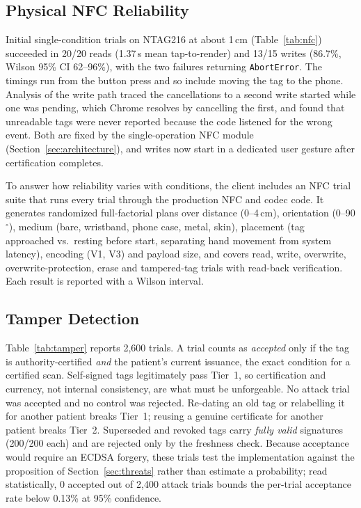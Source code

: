 \documentclass[conference]{IEEEtran}
\begin{document}


\subsection{Physical NFC Reliability}
\label{sec:nfc-results}
Initial single-condition trials on NTAG216 at about 1\,cm (Table~\ref{tab:nfc}) succeeded in 20/20 reads (1.37\,s mean tap-to-render) and 13/15 writes (86.7\%, Wilson 95\% CI 62--96\%), with the two failures returning \texttt{AbortError}. The timings run from the button press and so include moving the tag to the phone. Analysis of the write path traced the cancellations to a second write started while one was pending, which Chrome resolves by cancelling the first, and found that unreadable tags were never reported because the code listened for the wrong event. Both are fixed by the single-operation NFC module (Section~\ref{sec:architecture}), and writes now start in a dedicated user gesture after certification completes.



To answer how reliability varies with conditions, the client includes an NFC trial suite that runs every trial through the production NFC and codec code. It generates randomized full-factorial plans over distance (0--4\,cm), orientation (0--90$^\circ$), medium (bare, wristband, phone case, metal, skin), placement (tag approached vs.\ resting before start, separating hand movement from system latency), encoding (V1, V3) and payload size, and covers read, write, overwrite, overwrite-protection, erase and tampered-tag trials with read-back verification. Each result is reported with a Wilson interval.

\subsection{Tamper Detection}
Table~\ref{tab:tamper} reports 2{,}600 trials. A trial counts as \emph{accepted} only if the tag is authority-certified \emph{and} the patient's current issuance, the exact condition for a certified scan. Self-signed tags legitimately pass Tier~1, so certification and currency, not internal consistency, are what must be unforgeable. No attack trial was accepted and no control was rejected. Re-dating an old tag or relabelling it for another patient breaks Tier~1; reusing a genuine certificate for another patient breaks Tier~2. Superseded and revoked tags carry \emph{fully valid} signatures (200/200 each) and are rejected only by the freshness check. Because acceptance would require an ECDSA forgery, these trials test the implementation against the proposition of Section~\ref{sec:threats} rather than estimate a probability; read statistically, 0 accepted out of 2{,}400 attack trials bounds the per-trial acceptance rate below 0.13\% at 95\% confidence.
\end{document}
